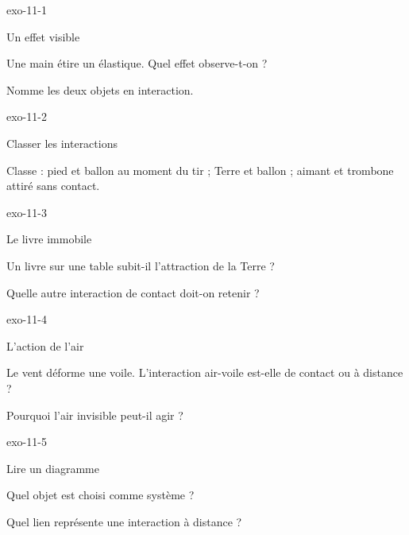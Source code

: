 \documentclass[12pt,twoside,openany]{book}
\begin{document}
\clearpage{}
\begin{blocLivre}{exo-11-1}
\begin{exercice}[1]{Un effet visible}
\begin{questions}
\item Une main étire un élastique. Quel effet observe-t-on ?
\item Nomme les deux objets en interaction.
\end{questions}
\end{exercice}\end{blocLivre}
\begin{blocLivre}{exo-11-2}
\begin{exercice}[1]{Classer les interactions}
\begin{questions}
\item Classe : pied et ballon au moment du tir ; Terre et ballon ; aimant et trombone attiré sans contact.
\end{questions}
\end{exercice}\end{blocLivre}
\begin{blocLivre}{exo-11-3}
\begin{exercice}[1]{Le livre immobile}
\begin{questions}
\item Un livre sur une table subit-il l’attraction de la Terre ?
\item Quelle autre interaction de contact doit-on retenir ?
\end{questions}
\end{exercice}\end{blocLivre}
\begin{blocLivre}{exo-11-4}
\begin{exercice}[1]{L’action de l’air}
\begin{questions}
\item Le vent déforme une voile. L’interaction air-voile est-elle de contact ou à distance ?
\item Pourquoi l’air invisible peut-il agir ?
\end{questions}
\end{exercice}\end{blocLivre}
\begin{blocLivre}{exo-11-5}
\begin{exercice}[1]{Lire un diagramme}
\begin{questions}
\item Quel objet est choisi comme système ?
\item Quel lien représente une interaction à distance ?
\end{questions}
\end{exercice}\end{blocLivre}
\end{document}
